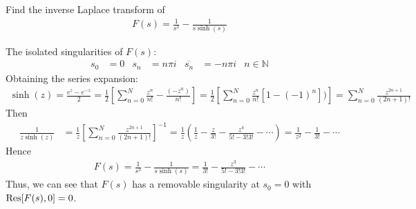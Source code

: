 \documentclass[12pt, english]{book}
\makeatletter
\renewenvironment{proof}[1][\proofname]{\par
	\pushQED{\qed}%
	\normalfont \topsep6\p@\@plus6\p@\relax
	\list{}{%
		\settowidth{\leftmargin}{\itshape\proofname:\hskip\labelsep}%
		\setlength{\labelwidth}{0pt}%
		\setlength{\itemindent}{-\leftmargin}%
		}%
	\item[\hskip\labelsep\itshape#1\@addpunct{:}]\ignorespaces
	}{\popQED\endlist\@endpefalse}
\makeatother
\begin{document}
	\begin{example}
		Find the inverse Laplace transform of
		\begin{align*}
			F(s) = \frac{1}{s^2} - \frac{1}{s \sinh(s)}
		\end{align*}
		\begin{proof}
			{\color{Grey}
			The isolated singularities of \(F(s)\):
			\begin{align*}
				s_0 &= 0 & s_n &= n\pi i & \overline{s_n} &= -n\pi i & n \in \mathbb{N}
			\end{align*}
			Obtaining the series expansion:
			\begin{align*}
				\sinh(z) = \frac{e^z - e^{-z}}{2} = \frac{1}{2}\left[\sum_{n=0}^{N} \frac{z^n}{n!} - \frac{(-z^n)}{n!}\right] = \frac{1}{2}\left[\sum_{n=0}^{N} \frac{z^n}{n!}[1-(-1)^n])\right] = \sum_{n=0}^{N} \frac{z^{2n+1}}{(2n+1)!}
			\end{align*}
			Then 
			\begin{align*}
				\frac{1}{z\sinh(z)} 
				&= \frac{1}{z} \left[ \sum_{n=0}^{N} \frac{z^{2n+1}}{(2n+1)!} \right]^{-1}
				 = \frac{1}{z} \left(\frac{1}{z} - \frac{z}{3!} - \frac{z^4}{5! - 3!3!} - \cdots \right)
				 = \frac{1}{z^2} - \frac{1}{3!} - \cdots 
			\end{align*}
			Hence
			\begin{align*}
				F(s) = \frac{1}{s^2} - \frac{1}{s \sinh(s)} = \frac{1}{3!} - \frac{z^3}{5! - 3!3!} - \cdots
			\end{align*}
			Thus, we can see that \(F(s)\) has a removable singularity at \(s_0 = 0\) with \(\Res[F(s), 0] = 0\).
			
}
\end{proof}
\end{example}
\end{document}
